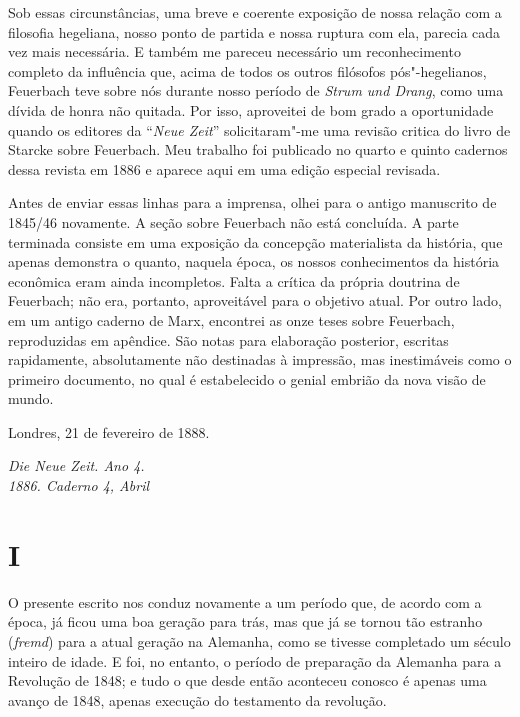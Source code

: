 Sob essas circunstâncias, uma breve e coerente exposição de nossa
relação com a filosofia hegeliana, nosso ponto de partida e nossa
ruptura com ela, parecia cada vez mais necessária. E também me pareceu
necessário um reconhecimento completo da influência que, acima de todos
os outros filósofos pós"-hegelianos, Feuerbach teve sobre nós durante
nosso período de \emph{Strum und Drang}, como uma dívida de honra não
quitada. Por isso, aproveitei de bom grado a oportunidade quando os
editores da ``\emph{Neue Zeit}'' solicitaram"-me uma revisão critica do
livro de Starcke sobre Feuerbach. Meu trabalho foi publicado no quarto e
quinto cadernos dessa revista em 1886 e aparece aqui em uma edição
especial revisada.

Antes de enviar essas linhas para a imprensa, olhei para o antigo
manuscrito de 1845/46 novamente. A seção sobre Feuerbach não está
concluída. A parte terminada consiste em uma exposição da concepção
materialista da história, que apenas demonstra o quanto, naquela época,
os nossos conhecimentos da história econômica eram ainda incompletos.
Falta a crítica da própria doutrina de Feuerbach; não era, portanto,
aproveitável para o objetivo atual. Por outro lado, em um antigo caderno
de Marx, encontrei as onze teses sobre Feuerbach, reproduzidas em
apêndice. São notas para elaboração posterior, escritas rapidamente,
absolutamente não destinadas à impressão, mas inestimáveis ​​como o
primeiro documento, no qual é estabelecido o genial embrião da nova
visão de mundo.

\bigskip

\hfill{}Londres, 21 de fevereiro de 1888.

\quebra

\begin{flushright}
\emph{Die Neue Zeit. Ano 4.}\\
\emph{1886. Caderno 4, Abril}
\end{flushright}

\vspace{2cm}


\section{I}

\noindent{}O presente escrito
nos conduz novamente a um período que, de acordo com a época, já ficou
uma boa geração para trás, mas que já se tornou tão estranho
(\emph{fremd}) para a atual geração na Alemanha, como se tivesse
completado um século inteiro de idade. E foi, no entanto, o período de
preparação da Alemanha para a Revolução de 1848; e tudo o que desde
então aconteceu conosco é apenas uma avanço de 1848, apenas execução do
testamento da revolução.

